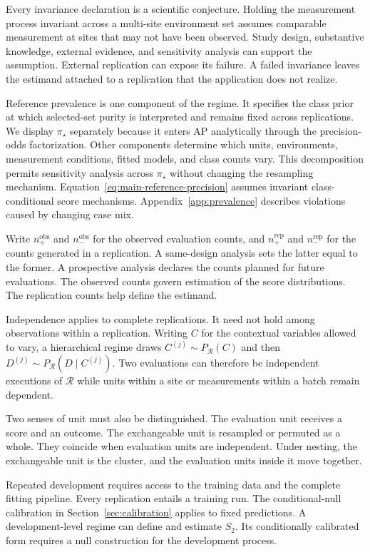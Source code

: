 \documentclass[11pt]{article}
\newcommand{\Regime}{\mathcal{R}}
\theoremstyle{remark}
\begin{document}
Every invariance declaration is a scientific conjecture. Holding the measurement process invariant across a multi-site environment set assumes comparable measurement at sites that may not have been observed. Study design, substantive knowledge, external evidence, and sensitivity analysis can support the assumption. External replication can expose its failure. A failed invariance leaves the estimand attached to a replication that the application does not realize.

Reference prevalence is one component of the regime. It specifies the class prior at which selected-set purity is interpreted and remains fixed across replications. We display $\pi_\star$ separately because it enters AP analytically through the precision-odds factorization. Other components determine which units, environments, measurement conditions, fitted models, and class counts vary. This decomposition permits sensitivity analysis across $\pi_\star$ without changing the resampling mechanism. Equation~\eqref{eq:main-reference-precision} assumes invariant class-conditional score mechanisms. Appendix~\ref{app:prevalence} describes violations caused by changing case mix.

Write $n_+^{\mathrm{obs}}$ and $n_-^{\mathrm{obs}}$ for the observed evaluation counts, and $n_+^{\mathrm{rep}}$ and $n_-^{\mathrm{rep}}$ for the counts generated in a replication. A same-design analysis sets the latter equal to the former. A prospective analysis declares the counts planned for future evaluations. The observed counts govern estimation of the score distributions. The replication counts help define the estimand.

Independence applies to complete replications. It need not hold among observations within a replication. Writing $C$ for the contextual variables allowed to vary, a hierarchical regime draws $C^{(j)}\sim P_{\Regime}(C)$ and then $D^{(j)}\sim P_{\Regime}(D\mid C^{(j)})$. Two evaluations can therefore be independent executions of $\Regime$ while units within a site or measurements within a batch remain dependent.

Two senses of unit must also be distinguished. The evaluation unit receives a score and an outcome. The exchangeable unit is resampled or permuted as a whole. They coincide when evaluation units are independent. Under nesting, the exchangeable unit is the cluster, and the evaluation units inside it move together.

Repeated development requires access to the training data and the complete fitting pipeline. Every replication entails a training run. The conditional-null calibration in Section~\ref{sec:calibration} applies to fixed predictions. A development-level regime can define and estimate $S_2$. Its conditionally calibrated form requires a null construction for the development process.
\end{document}
